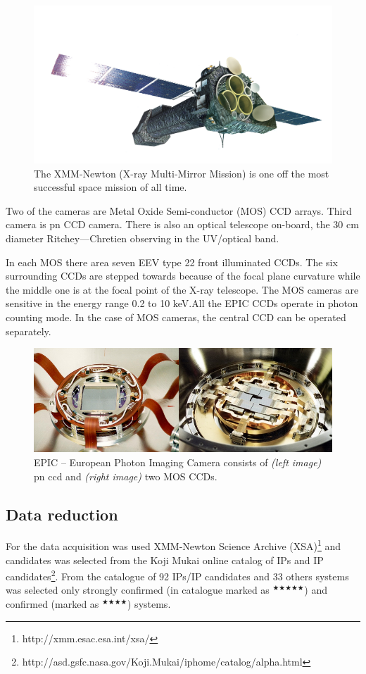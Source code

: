 \documentclass[oneside,a4paper,11pt]{report}
\begin{document}
\begin{figure}[!hbt]
\centering
\includegraphics[totalheight=6cm]{XMM}
\caption{The XMM-Newton (X-ray Multi-Mirror Mission) is one off the most successful space mission of all time.}
\label{xmmn1} 
\end{figure}

Two of the cameras are Metal Oxide Semi-conductor (MOS) CCD arrays. Third camera is pn CCD camera. 
There is also an optical telescope on-board, the 30 cm diameter Ritchey---Chretien observing in the
UV/optical band.  

In each MOS there area seven EEV type 22 front illuminated CCDs. The six surrounding CCDs are 
stepped towards because of the focal plane curvature while the middle one is at the focal point of 
the X-ray telescope. The MOS cameras are sensitive in the energy range 0.2 to 10 keV.All the EPIC CCDs 
operate in photon counting mode. In the case of MOS cameras, the central CCD can be operated separately. 

\begin{figure}[!hbt]
\centering
\includegraphics[totalheight=4cm]{plot/epic}
\caption{EPIC -- European Photon Imaging Camera consists of \textit{(left image)} pn ccd and 
\textit{(right image)} two MOS CCDs.}
\label{xmmn1_epic} 
\end{figure}


\subsection{Data reduction}
For the data acquisition was used XMM-Newton Science Archive (XSA)\footnote{http://xmm.esac.esa.int/xsa/} and
candidates was selected from the Koji Mukai online catalog of IPs and IP candidates\footnote{http://asd.gsfc.nasa.gov/Koji.Mukai/iphome/catalog/alpha.html}.
From the catalogue of 92 IPs/IP candidates and 33 others systems was selected only strongly confirmed 
(in catalogue marked as $^{\bigstar \bigstar \bigstar \bigstar \bigstar}$) 
and confirmed (marked as $^{\bigstar \bigstar \bigstar \bigstar}$) systems. 
\end{document}
